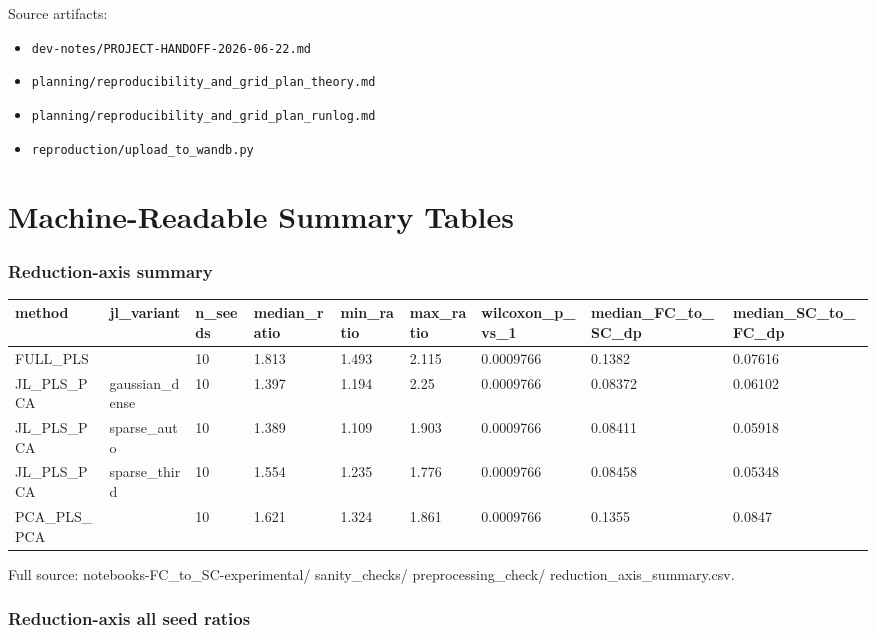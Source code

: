 Source artifacts:

\begin{itemize}
\tightlist
\item
  \texttt{dev-notes/PROJECT-HANDOFF-2026-06-22.md}
\item
  \texttt{planning/reproducibility\_and\_grid\_plan\_theory.md}
\item
  \texttt{planning/reproducibility\_and\_grid\_plan\_runlog.md}
\item
  \texttt{reproduction/upload\_to\_wandb.py}
\end{itemize}

\section{Machine-Readable Summary Tables}\label{machine-readable-summary-tables}

\subsubsection{Reduction-axis summary}\label{reduction-axis-summary}

{\def\LTcaptype{none} %
\begin{longtable}[]{@{}lllllllll@{}}
\toprule\noalign{}
method & jl\_variant & n\_seeds & median\_ratio & min\_ratio & max\_ratio & wilcoxon\_p\_vs\_1 & median\_FC\_to\_SC\_dp & median\_SC\_to\_FC\_dp \\
\midrule\noalign{}
\endhead
\bottomrule\noalign{}
\endlastfoot
FULL\_PLS & & 10 & 1.813 & 1.493 & 2.115 & 0.0009766 & 0.1382 & 0.07616 \\
JL\_PLS\_PCA & gaussian\_dense & 10 & 1.397 & 1.194 & 2.25 & 0.0009766 & 0.08372 & 0.06102 \\
JL\_PLS\_PCA & sparse\_auto & 10 & 1.389 & 1.109 & 1.903 & 0.0009766 & 0.08411 & 0.05918 \\
JL\_PLS\_PCA & sparse\_third & 10 & 1.554 & 1.235 & 1.776 & 0.0009766 & 0.08458 & 0.05348 \\
PCA\_PLS\_PCA & & 10 & 1.621 & 1.324 & 1.861 & 0.0009766 & 0.1355 & 0.0847 \\
\end{longtable}
}

Full source: notebooks-FC\_to\_SC-experimental/ sanity\_checks/ preprocessing\_check/ reduction\_axis\_summary.csv.

\subsubsection{Reduction-axis all seed ratios}\label{reduction-axis-all-seed-ratios}

